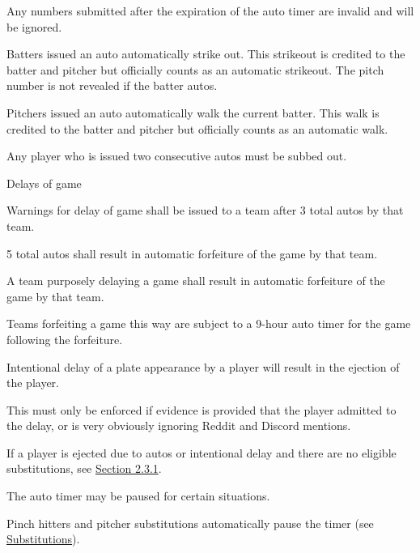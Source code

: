 \begin{deepEnumerate}
\begin{deepEnumerate}
		\begin{deepEnumerate}
			\item Any numbers submitted after the expiration of the auto timer are invalid and will be ignored.
			\item Batters issued an auto automatically strike out. This strikeout is credited to the batter and pitcher but officially counts as an automatic strikeout.
			The pitch number is not revealed if the batter autos.
			\item Pitchers issued an auto automatically walk the current batter. This walk is credited to the batter and pitcher but officially counts as an automatic walk.
		\end{deepEnumerate}
		\item Any player who is issued two consecutive autos must be subbed out.
		\item Delays of game
		\begin{deepEnumerate}
			\item Warnings for delay of game shall be issued to a team after 3 total autos by that team.
			\item 5 total autos shall result in automatic forfeiture of the game by that team.
			\item A team purposely delaying a game shall result in automatic forfeiture of the game by that team.
			\begin{deepEnumerate}
				\item Teams forfeiting a game this way are subject to a 9-hour auto timer for the game following the forfeiture.
			\end{deepEnumerate}
			\item Intentional delay of a plate appearance by a player will result in the ejection of the player.
			\begin{deepEnumerate}
				\item This must only be enforced if evidence is provided that the player admitted to the delay, or is very obviously ignoring Reddit and Discord mentions.
			\end{deepEnumerate}
		\end{deepEnumerate}
		\item If a player is ejected due to autos or intentional delay and there are no eligible substitutions, see \hyperref[sec:lineups]{Section 2.3.1}.
		\item The auto timer may be paused for certain situations.
		\begin{deepEnumerate}
			\item Pinch hitters and pitcher substitutions automatically pause the timer (see \hyperref[sec:substitutions]{Substitutions}).

\end{deepEnumerate}
\end{deepEnumerate}
\end{deepEnumerate}
